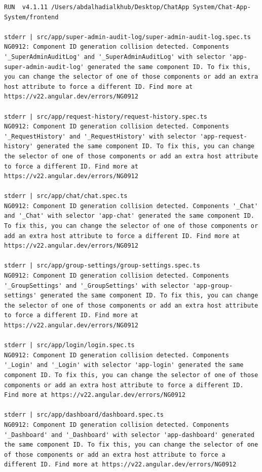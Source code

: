 \documentclass[10pt,a4paper]{article}
\begin{document}
\begin{Verbatim}[fontsize=\scriptsize,breaklines,frame=single]
 RUN  v4.1.11 /Users/abdalhadialkhub/Desktop/ChatApp System/Chat-App-System/frontend

stderr | src/app/super-admin-audit-log/super-admin-audit-log.spec.ts
NG0912: Component ID generation collision detected. Components '_SuperAdminAuditLog' and '_SuperAdminAuditLog' with selector 'app-super-admin-audit-log' generated the same component ID. To fix this, you can change the selector of one of those components or add an extra host attribute to force a different ID. Find more at https://v22.angular.dev/errors/NG0912

stderr | src/app/request-history/request-history.spec.ts
NG0912: Component ID generation collision detected. Components '_RequestHistory' and '_RequestHistory' with selector 'app-request-history' generated the same component ID. To fix this, you can change the selector of one of those components or add an extra host attribute to force a different ID. Find more at https://v22.angular.dev/errors/NG0912

stderr | src/app/chat/chat.spec.ts
NG0912: Component ID generation collision detected. Components '_Chat' and '_Chat' with selector 'app-chat' generated the same component ID. To fix this, you can change the selector of one of those components or add an extra host attribute to force a different ID. Find more at https://v22.angular.dev/errors/NG0912

stderr | src/app/group-settings/group-settings.spec.ts
NG0912: Component ID generation collision detected. Components '_GroupSettings' and '_GroupSettings' with selector 'app-group-settings' generated the same component ID. To fix this, you can change the selector of one of those components or add an extra host attribute to force a different ID. Find more at https://v22.angular.dev/errors/NG0912

stderr | src/app/login/login.spec.ts
NG0912: Component ID generation collision detected. Components '_Login' and '_Login' with selector 'app-login' generated the same component ID. To fix this, you can change the selector of one of those components or add an extra host attribute to force a different ID. Find more at https://v22.angular.dev/errors/NG0912

stderr | src/app/dashboard/dashboard.spec.ts
NG0912: Component ID generation collision detected. Components '_Dashboard' and '_Dashboard' with selector 'app-dashboard' generated the same component ID. To fix this, you can change the selector of one of those components or add an extra host attribute to force a different ID. Find more at https://v22.angular.dev/errors/NG0912


\end{Verbatim}
\end{document}
